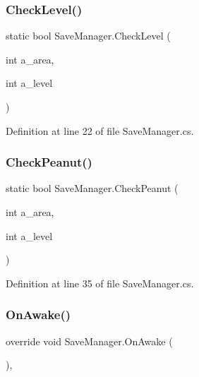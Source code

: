 \subsubsection{\texorpdfstring{Check\+Level()}{CheckLevel()}}
{\footnotesize\ttfamily static bool Save\+Manager.\+Check\+Level (\begin{DoxyParamCaption}\item[{int}]{a\+\_\+area,  }\item[{int}]{a\+\_\+level }\end{DoxyParamCaption})\hspace{0.3cm}{\ttfamily [static]}}



Definition at line 22 of file Save\+Manager.\+cs.

\mbox{\label{class_save_manager_a4062394b6bb7d1fe6212f5946d74fa08}} 
\subsubsection{\texorpdfstring{Check\+Peanut()}{CheckPeanut()}}
{\footnotesize\ttfamily static bool Save\+Manager.\+Check\+Peanut (\begin{DoxyParamCaption}\item[{int}]{a\+\_\+area,  }\item[{int}]{a\+\_\+level }\end{DoxyParamCaption})\hspace{0.3cm}{\ttfamily [static]}}



Definition at line 35 of file Save\+Manager.\+cs.

\mbox{\label{class_save_manager_a74ded72b7bc7c81cc87722a84518ebcf}} 
\subsubsection{\texorpdfstring{On\+Awake()}{OnAwake()}}
{\footnotesize\ttfamily override void Save\+Manager.\+On\+Awake (\begin{DoxyParamCaption}{ }\end{DoxyParamCaption})\hspace{0.3cm}{\ttfamily [protected]}, {\ttfamily [virtual]}}



